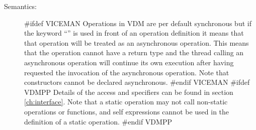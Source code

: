 \documentclass[\pformat,12pt]{article}
\begin{document}
\begin{description}












\item[Semantics:]
#ifdef VICEMAN
Operations in VDM are per default synchronous but if the keyword 
``'' is used in front of an operation definition it means that
that operation will be treated as an asynchronous operation. This means
that the operation cannot have a return type and the thread calling an
asynchronous operation will continue its own execution after having 
requested the invocation of the asynchronous operation. Note that
constructors cannot be declared asynchronous.
#endif VICEMAN
#ifdef VDMPP
Details of the access and  specifiers can be found in
section \ref{ch:interface}. Note that a static operation may not call
non-static operations or functions, and self expressions cannot be
used in the definition of a static operation.
#endif VDMPP


\end{description}
\end{document}
